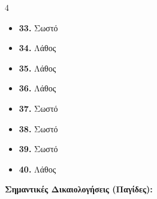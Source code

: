 \documentclass[a4paper,11pt,twoside]{article}
\begin{document}
\begin{tcolorbox}[colback=black!5!white, colframe=black, title=\textbf{Κλειδί Απαντήσεων}]
\begin{multicols}{4}
\begin{itemize}[label=$-$]
    \item \textbf{33.} Σωστό
    \item \textbf{34.} Λάθος
    \item \textbf{35.} Λάθος
    \item \textbf{36.} Λάθος
    \item \textbf{37.} Σωστό
    \item \textbf{38.} Σωστό
    \item \textbf{39.} Σωστό
    \item \textbf{40.} Λάθος
\end{itemize}
\end{multicols}
\end{tcolorbox}

\vspace{0.3cm}
\noindent \textbf{Σημαντικές Δικαιολογήσεις (Παγίδες):}
\end{document}
